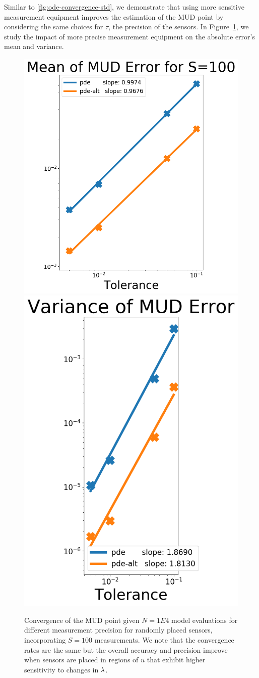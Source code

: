 Similar to \ref{fig:ode-convergence-std}, we demonstrate that using more sensitive measurement equipment improves the estimation of the MUD point by considering the same choices for $\tau$, the precision of the sensors.
In Figure~\ref{fig:pde-convergence-std}, we study the impact of more precise measurement equipment on the absolute error's mean and variance.


\begin{figure}[htbp]
  \centering
  \includegraphics[width=0.475\linewidth]{figures/pde/pde_convergence_mud_std_mean}
  \includegraphics[width=0.475\linewidth]{figures/pde/pde_convergence_mud_std_var}
  \caption{Convergence of the MUD point given $N=1E4$ model evaluations for different measurement precision for randomly placed sensors, incorporating $S=100$ measurements.
  We note that the convergence rates are the same but the overall accuracy and precision improve when sensors are placed in regions of $u$ that exhibit higher sensitivity to changes in $\lambda$.
  }
  \label{fig:pde-convergence-std}
\end{figure}


